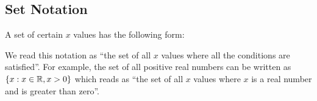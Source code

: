             \subsection{ Set Notation}
            \nopagebreak
          \label{m39337*id236056}A set of certain $x$ values has the following form:\par 
          \label{m39337*uid43}\nopagebreak\noindent{}
          \label{m39337*id236100}We read this notation as ``the set of all $x$ values where all the conditions are satisfied''. For example, the set of all positive real numbers can be written as $\{x:x\in \mathbb{R},x>{}0\}$ which reads as ``the set of all $x$ values where $x$ is a real number and is greater than zero''.\par 
        \label{m39337*uid44}
